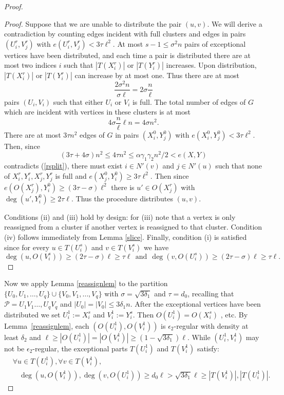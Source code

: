 \documentclass[oneside,12pt]{memoir}
\newcommand{\ep}{\epsilon}
\newcommand{\g}{\gamma}
\begin{document}
\begin{proof}
\begin{proof}
Suppose that we are unable to distribute the pair $(u,v)$. We will derive a contradiction by counting edges incident with full clusters and edges in pairs $(U_i^r,V_j^r)$ with $e(U_i^r,V_j^r)< 3\tau \ell^2$.  At most $s-1\leq \sigma^2 n$ pairs of exceptional vertices have been distributed, and each time a pair is distributed there are at most two indices $i$ such that $|T(X_i^r)|$ or $|T(Y_i^r)|$ increases.  Upon distribution, $|T(X_i^r)|$ or $|T(Y_i^r)|$ can increase by at most one. Thus there are at most
$$\frac{2\sigma^2 n}{\sigma \ell} = 2\sigma \frac{n}{\ell}$$
pairs $(U_i, V_i)$ such that either $U_i$ or $V_i$ is full. The total number of edges of $G$ which are incident with vertices in these clusters is at most $$4 \sigma\frac{n}{\ell}\ell n= 4\sigma n^2.$$  There are 
at most $3\tau n^2$ edges of $G$ in pairs $(X_i^0, Y_j^0)$ with 
$e(X_i^0,Y_j^0)< 3 \tau \ell^2.$
Then, since
$$(3\tau + 4\sigma)n^2 \leq 4\tau n^2 \leq \alpha \g_1\g_2 n^2/2 < e(X,Y)$$
contradicts (\ref{rsplit}), there must exist $i \in N'(v)$ and $j \in N'(u)$ such that none of $X_i^r,Y_i^r, X_j^r, Y_j^r$ is full and $e(X_j^0, Y_i^0) \geq 3 \tau\ell^2.$  Then since $e(O(X_j^r),Y_i^0)\ge (3\tau-\sigma)\ell^2$ there is $u'\in O(X_j^r)$ with $\deg(u',Y_i^0) \geq 2\tau\ell$.  Thus the procedure distributes $(u,v)$.

Conditions (ii) and (iii) hold by design: for (iii) note that a vertex is only reassigned from a cluster if another vertex is reassigned to that cluster. Condition (iv) follows immediately from Lemma \ref{slice}. Finally, condition (i) is satisfied since for every $u\in T(U_{i}^s)$ and $v\in T(V_{i}^s)$ we have
$$\deg(u,O(V_{i}^s)) \geq (2\tau-\sigma)\ell\ge \tau \ell ~~\text{and}~~ \deg\left(v,O(U_{i}^s)\right) \ge (2\tau-\sigma)\ell \ge \tau \ell.$$
\end{proof}

Now we apply Lemma \ref{reassignlem} to the partition $\{U_0,U_1,\dots,U_q\}\cup\{V_0,V_1,\dots,V_q\}$ with $\sigma=\sqrt{3\delta_1}$ and $\tau=d_0$, recalling that $\mathcal{P}=U_{1}V_{1} \dots,U_{q}V_{q}$ and $|U_0|=|V_0|\leq 3\delta_1 n$.
After the exceptional vertices have been distributed we set $U_i^1:=X_i^s$ and $V_i^1:= Y_i^s$. Then $O(U_i^1)=O(X_i^s)$
, etc.  By Lemma~\ref{reassignlem}, each  $(O(U_{i}^1),O(V_i^1))$ is $\ep_2$-regular with density at least $\delta_2$ and $\ell\geq|O(U_i^1)|=|O(V_i^1)|\geq(1-\sqrt{3\delta_1})\ell$. While $(U_{i}^1,V_{i}^1)$ may not be $\ep_2$-regular, the exceptional parts  $T(U_i^1)$ and $T(V_i^1)$ satisfy:
\begin{align*}
&\forall u\in T(U_{i}^1), 
\forall v\in T(V_{i}^1),\\ 
&~~~~\deg(u,O(V_{i}^1)), \deg( v,O(U_{i}^1)) \ge d_0 \ell> \sqrt{3\delta_1}\ell\ge |T(V_i^1)|,|T(U_i^1)|.
\end{align*}



\end{proof}
\end{document}
